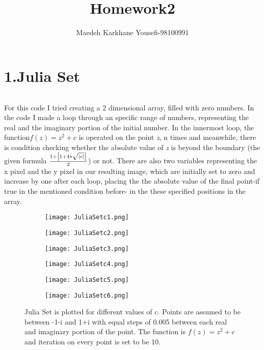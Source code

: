 \documentclass[12pt,a4paper]{article}
\title{\textbf{Homework2}}
\author{Maedeh Karkhane Yousefi-98100991}
\begin{document}
\maketitle
\part*{1.Julia Set}

	\paragraph*{}
		For this code I tried creating a 2 dimensional array, filled with zero numbers. In the code I made a loop through an specific range of numbers, representing the real and the imaginary portion of the initial number.  In the innermost loop, the function\textit{$f(z)=z^2+c$} is operated on the point \textit{z}, n times and meanwhile, there is condition checking whether the absolute value of \textit{z} is beyond the boundary (the given formula \textit{$\frac{1+\abs{1+4*\sqrt{\abs{c}}}}{2}$}) or not. There are also two variables representing the x pixel and the y pixel in our resulting image, which are initially set to zero and increase by one after each loop, placing the the absolute value of the final point-if true in the mentioned condition before- in the these specified positions in the array. 
\begin{figure}[H]
	\begin{subfigure}[b]{0.5\textwidth}
		\centering
		\texttt{[image: JuliaSetc1.png]}
		\label{fig:1.1}
	\end{subfigure}\hfill
	\begin{subfigure}[b]{0.5\textwidth}
		\centering
		\texttt{[image: JuliaSetc2.png]}
		\label{fig:1.2}
	\end{subfigure}\hfill
	\begin{subfigure}[b]{0.5\textwidth}
		\centering
		\texttt{[image: JuliaSetc3.png]}
		\label{fig:1.3}
	\end{subfigure}\hfill
	\begin{subfigure}[b]{0.5\textwidth}
		\centering
		\texttt{[image: JuliaSetc4.png]}
		\label{fig:1.4}
	\end{subfigure}\hfill
	\begin{subfigure}[b]{0.5\textwidth}
		\centering
		\texttt{[image: JuliaSetc5.png]}
		\label{fig:1.5}
	\end{subfigure}\hfill
	\begin{subfigure}[b]{0.5\textwidth}
		\centering
		\texttt{[image: JuliaSetc6.png]}
		\label{fig:1.6}
	\end{subfigure}\hfill
	\label{fig:mesh1}
	\caption{Julia Set is plotted for different values of c. Points are assumed to be between -1-i and 1+i with equal steps of 0.005 between each real and imaginary portion of the point. The function is $f(z)=z^2+c$ and iteration on every point is set to be 10.}
\end{figure}
\end{document}
